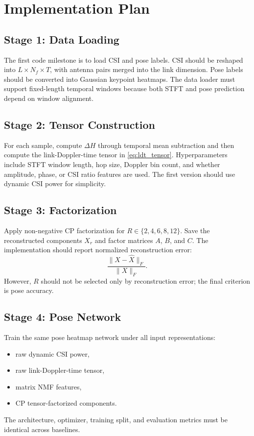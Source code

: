 \documentclass[10pt,journal]{IEEEtran}
\begin{document}
\section{Implementation Plan}

\subsection{Stage 1: Data Loading}

The first code milestone is to load CSI and pose labels. CSI should be reshaped into $L\times N_f\times T$, with antenna pairs merged into the link dimension. Pose labels should be converted into Gaussian keypoint heatmaps. The data loader must support fixed-length temporal windows because both STFT and pose prediction depend on window alignment.

\subsection{Stage 2: Tensor Construction}

For each sample, compute $\Delta H$ through temporal mean subtraction and then compute the link-Doppler-time tensor in \eqref{eq:ldt_tensor}. Hyperparameters include STFT window length, hop size, Doppler bin count, and whether amplitude, phase, or CSI ratio features are used. The first version should use dynamic CSI power for simplicity.

\subsection{Stage 3: Factorization}

Apply non-negative CP factorization for $R\in\{2,4,6,8,12\}$. Save the reconstructed components $X_r$ and factor matrices $A$, $B$, and $C$. The implementation should report normalized reconstruction error:
\begin{equation}
    \frac{\|X-\hat{X}\|_F}{\|X\|_F}.
\end{equation}
However, $R$ should not be selected only by reconstruction error; the final criterion is pose accuracy.

\subsection{Stage 4: Pose Network}

Train the same pose heatmap network under all input representations:
\begin{itemize}
    \item raw dynamic CSI power,
    \item raw link-Doppler-time tensor,
    \item matrix NMF features,
    \item CP tensor-factorized components.
\end{itemize}
The architecture, optimizer, training split, and evaluation metrics must be identical across baselines.
\end{document}
